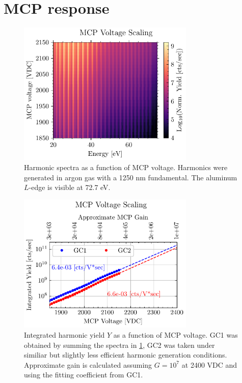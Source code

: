 
\section{MCP response}

\begin{figure}
	\centering
	\includegraphics[width=0.75\textwidth]{figures/chap3/MCP_voltage_spectro.pdf}
	\caption{Harmonic spectra as a function of MCP voltage. Harmonics were generated in argon gas with a 1250 nm fundamental. The aluminum $L$-edge is visible at 72.7 eV.}
	\label{fig:MCP_voltage_spectro}
\end{figure}

\begin{figure}
	\centering
	\includegraphics[width=0.75\textwidth]{figures/chap3/MCP_voltage_sum.pdf}
	\caption{Integrated harmonic yield $Y$ as a function of MCP voltage. GC1 was obtained by summing the spectra in \cref{fig:MCP_voltage_spectro}, GC2 was taken under similiar but slightly less efficient harmonic generation conditions. Approximate gain is calculated assuming $G = 10^7$ at 2400 VDC and using the fitting coefficient from GC1.}
	\label{fig:MCP_voltage_sumo}
\end{figure}

